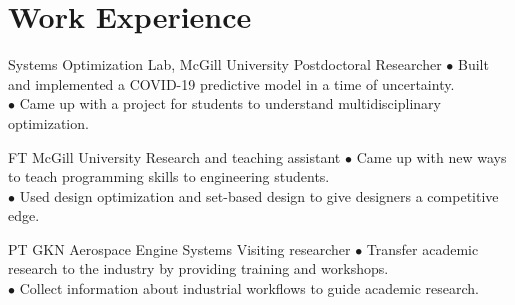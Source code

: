 \documentclass[10pt]{article} %
\begin{document}
\section{Work Experience}





{} %
{Systems Optimization Lab, McGill University} %
{Postdoctoral Researcher} %
{
	$\bullet$ Built and implemented a COVID-19 predictive model in a time of uncertainty.\\
	$\bullet$ Came up with a project for students to understand multidisciplinary optimization.
} %


{FT} %
{McGill University} %
{Research and teaching assistant} %
{
	$\bullet$ Came up with new ways to teach programming skills to engineering students.\\
	$\bullet$ Used design optimization and set-based design to give designers a competitive edge.
}  %


{PT} %
{GKN Aerospace Engine Systems} %
{Visiting researcher} %
{
	$\bullet$ Transfer academic research to the industry by providing training and workshops.\\
	$\bullet$ Collect information about industrial workflows to guide academic research.
}  %


\vspace{-\baselineskip} %

\end{document}
